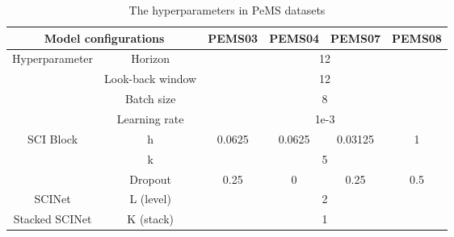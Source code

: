 \documentclass{article}
\begin{document}
\begin{table*}[h]
\centering
\caption{The hyperparameters in PeMS datasets}
\resizebox{0.7\textwidth}{!}
{
\begin{tabular}{c|c|c|c|c|c}
\hline
\multicolumn{2}{c|}{Model configurations}          & PEMS03       & PEMS04       & PEMS07 & PEMS08       \\ \hline
\multirow{4}{*}{Hyperparameter} & Horizon          & \multicolumn{4}{c}{12} \\ \cline{2-6} 
                                & Look-back window & \multicolumn{4}{c}{12}  \\ \cline{2-6} 
                                & Batch size       & \multicolumn{4}{c}{8}  \\ \cline{2-6}
                                & Learning rate    & \multicolumn{4}{c}{1e-3}  \\ \hline
\multirow{3}{*}{SCI Block}      & h                & 0.0625    & 0.0625    & 0.03125    & 1   \\ \cline{2-6} 
                                & k                & \multicolumn{4}{c}{5}   \\ \cline{2-6}
                                & Dropout       & 0.25 & 0 & 0.25 & 0.5 \\ \hline
SCINet                          & L (level)        & \multicolumn{4}{c}{2}   \\ \hline
Stacked SCINet                  & K (stack)        & \multicolumn{4}{c}{1}    \\ \hline
\end{tabular}}
\label{tab:pems}
\vspace{-8pt}
\end{table*}
\end{document}
